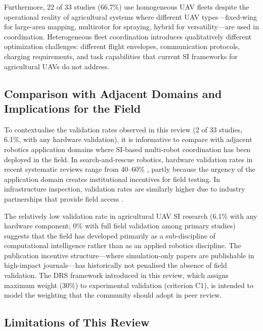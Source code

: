 \documentclass[review,3p,times]{elsarticle}
\begin{document}
Furthermore, 22 of 33 studies (66.7\%) use homogeneous UAV fleets despite the operational reality of agricultural systems where different UAV types---fixed-wing for large-area mapping, multirotor for spraying, hybrid for versatility---are used in coordination. Heterogeneous fleet coordination introduces qualitatively different optimization challenges: different flight envelopes, communication protocols, charging requirements, and task capabilities that current SI frameworks for agricultural UAVs do not address.

\subsection{Comparison with Adjacent Domains and Implications for the Field}
\label{sec:comparison}

To contextualise the validation rates observed in this review (2 of 33 studies, 6.1\%, with any hardware validation), it is informative to compare with adjacent robotics application domains where SI-based multi-robot coordination has been deployed in the field. In search-and-rescue robotics, hardware validation rates in recent systematic reviews range from 40--60\% \cite{chung2018}, partly because the urgency of the application domain creates institutional incentives for field testing. In infrastructure inspection, validation rates are similarly higher due to industry partnerships that provide field access \cite{brambilla2013}.

The relatively low validation rate in agricultural UAV SI research (6.1\% with any hardware component; 0\% with full field validation among primary studies) suggests that the field has developed primarily as a sub-discipline of computational intelligence rather than as an applied robotics discipline. The publication incentive structure---where simulation-only papers are publishable in high-impact journals---has historically not penalised the absence of field validation. The DRS framework introduced in this review, which assigns maximum weight (30\%) to experimental validation (criterion C1), is intended to model the weighting that the community should adopt in peer review.

\subsection{Limitations of This Review}
\label{sec:limitations_discussion}
\end{document}
